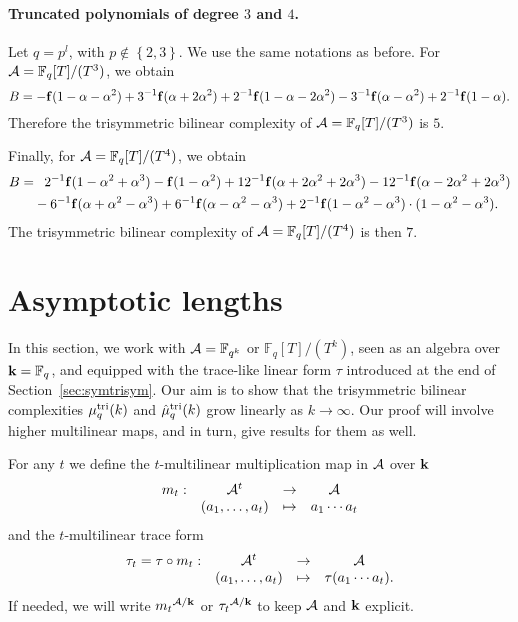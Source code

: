 \documentclass[11pt]{article}
\begin{document}
\paragraph{Truncated polynomials of degree $3$ and $4$.} Let $q=p^l$, with
$p\notin\left\{ 2, 3 \right\}$. We use the same notations as before. For
$\mathcal{A}=\mathbb{F}_{q}[T]/(T^3)$, we obtain
\[
  B =
  -\mathbf{f}(1-\alpha-\alpha^2)+3^{-1}\mathbf{f}(\alpha+2\alpha^2)
  +2^{-1}\mathbf{f}(1-\alpha-2\alpha^2) -
  3^{-1}\mathbf{f}(\alpha-\alpha^2)
  +2^{-1}\mathbf{f}(1-\alpha).
\]
Therefore the trisymmetric bilinear complexity of
$\mathcal{A}=\mathbb{F}_q[T]/(T^3)$ is $5$.

Finally, for $\mathcal{A}=\mathbb{F}_{q}[T]/(T^4)$, we obtain
\begin{equation*}
  \begin{split}
    B =&\phantom{-}2^{-1}\mathbf{f}(1-\alpha^2+\alpha^3)-\mathbf{f}(1-\alpha^2)
  +12^{-1}\mathbf{f}(\alpha+2\alpha^2+2\alpha^3)
  -12^{-1}\mathbf{f}(\alpha-2\alpha^2+2\alpha^3)\\
  &-6^{-1}\mathbf{f}(\alpha+\alpha^2-\alpha^3)
  +6^{-1}\mathbf{f}(\alpha-\alpha^2-\alpha^3)
  +2^{-1}\mathbf{f}(1-\alpha^2-\alpha^3)\cdot(1-\alpha^2-\alpha^3).
  \end{split}
\end{equation*}
The trisymmetric bilinear complexity of $\mathcal{A}=\mathbb{F}_q[T]/(T^4)$ is then $7$.


\section{Asymptotic lengths}
\label{sec:asymptotic}
In this section, we work with $\mathcal{A}=\mathbb{F}_{q^k}$ or $\mathbb{F}_q[T]/(T^k)$, seen as an algebra over $\mathbf{k}=\mathbb{F}_q$, and equipped with the trace-like linear form $\tau$ introduced at the end of Section~\ref{sec:symtrisym}.
Our aim is to show that the trisymmetric bilinear complexities $\mu^{\textrm{tri}}_q(k)$ and $\hat\mu^{\textrm{tri}}_q(k)$ grow linearly as $k\to\infty$.
Our proof will involve higher multilinear maps, and in turn, give results for them as well.

For any $t$ we define the $t$-multilinear multiplication map in $\mathcal{A}$ over $\mathbf{k}$
\[
\begin{array}{cccc}
m_t:&\mathcal{A}^t&\to&\mathcal{A}\\
&(a_1,\dots,a_t)&\mapsto&a_1\cdots a_t
\end{array}
\]
and the $t$-multilinear trace form
\[
\begin{array}{cccc}
\tau_t=\tau\circ m_t:&\mathcal{A}^t&\to&\mathcal{A}\\
&(a_1,\dots,a_t)&\mapsto&\tau(a_1\cdots a_t).
\end{array}
\]
If needed, we will write ${m_t}^{\mathcal{A}/\mathbf{k}}$ or ${\tau_t}^{\mathcal{A}/\mathbf{k}}$ to keep $\mathcal{A}$ and $\mathbf{k}$ explicit. 
\end{document}
